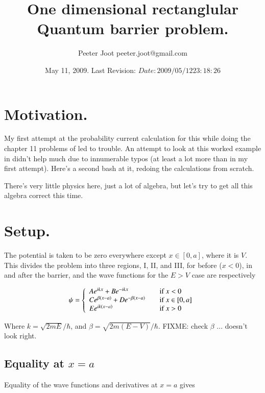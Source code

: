\documentclass{article}
\title{ One dimensional rectanglular Quantum barrier problem. }
\author{Peeter Joot \quad peeter.joot@gmail.com }
\date{ May 11, 2009.  Last Revision: $Date: 2009/05/12 23:18:26 $ }
\begin{document}
\maketitle{}
\tableofcontents
\section{ Motivation. }

My first attempt at the probability current calculation for this
while doing the chapter 11 problems of \cite{bohm1989qt} led to trouble.
An attempt to look at this worked example in \cite{mcmahon2005qmd} didn't 
help much due to innumerable typos (at least a lot more than in my first attempt).
Here's a second bash at it, redoing the calculations from scratch.

There's very little physics here, just a lot of algebra, but let's try
to get all this algebra correct this time.

\section{ Setup. }

The potential is taken to be zero everywhere except $x \in [0,a]$, where it is
$V$.  This divides the problem into three regions, I, II, and III, for 
before ($x<0$), in and after the barrier, and the wave functions for the 
$E >V$ case are respectively

\begin{equation}
\psi =
\left\{
\begin{array}{l l}
A e^{i k x} + B e^{-i k x} & \quad \mbox{if $x <0$} \\
C e^{ \beta(x-a)} + D e^{ -\beta(x-a)} & \quad \mbox{if $x \in [0,a]$} \\
E e^{i k(x-a)} & \quad \mbox{if $x >0$} \\
\end{array}
\right.
\end{equation}

Where $k = \sqrt{2 m E}/\hbar$, and $\beta = \sqrt{2 m (E-V)}/\hbar$.
FIXME: check $\beta$ ... doesn't look right.

\subsection{ Equality at $x=a$ }

Equality of the wave functions and derivatives at $x=a$ gives
\end{document}
